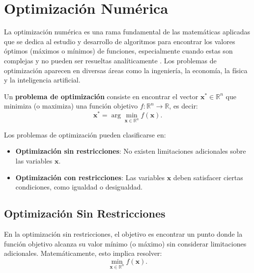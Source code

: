 
\chapter{Optimización Numérica}

La optimización numérica es una rama fundamental de las matemáticas aplicadas que se dedica al estudio y desarrollo de algoritmos para encontrar los valores óptimos (máximos o mínimos) de funciones, especialmente cuando estas son complejas y no pueden ser resueltas analíticamente \cite{nocedal2006numerical}. Los problemas de optimización aparecen en diversas áreas como la ingeniería, la economía, la física y la inteligencia artificial.

\begin{definicion}
\label{def:optimizacion}
Un \textbf{problema de optimización} consiste en encontrar el vector $\mathbf{x}^* \in \mathbb{R}^n$ que minimiza (o maximiza) una función objetivo $f: \mathbb{R}^n \rightarrow \mathbb{R}$, es decir:
\begin{equation}
\mathbf{x}^* = \arg\min_{\mathbf{x} \in \mathbb{R}^n} f(\mathbf{x}).
\end{equation}
\end{definicion}

Los problemas de optimización pueden clasificarse en:

\begin{itemize}
    \item \textbf{Optimización sin restricciones}: No existen limitaciones adicionales sobre las variables $\mathbf{x}$.
    \item \textbf{Optimización con restricciones}: Las variables $\mathbf{x}$ deben satisfacer ciertas condiciones, como igualdad o desigualdad.
\end{itemize}

\section{Optimización Sin Restricciones}

En la optimización sin restricciones, el objetivo es encontrar un punto donde la función objetivo alcanza su valor mínimo (o máximo) sin considerar limitaciones adicionales. Matemáticamente, esto implica resolver:
\begin{equation}
\min_{\mathbf{x} \in \mathbb{R}^n} f(\mathbf{x}).
\end{equation}

